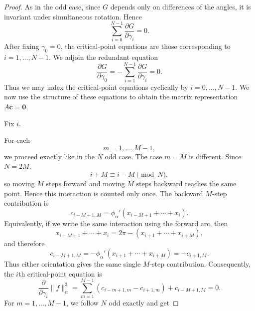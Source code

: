 \documentclass{article}
\begin{document}
\begin{proof}

As in the odd case, since $G$ depends only on differences of the angles, it is invariant under simultaneous rotation. Hence
\[
\sum_{i=0}^{N-1}\frac{\partial G}{\partial\gamma_i}=0.
\]
After fixing $\gamma_0=0$, the critical-point equations are those
corresponding to $i=1,\dots,N-1$. We adjoin the redundant equation
\[
\frac{\partial G}{\partial\gamma_0}
=
-\sum_{i=1}^{N-1}\frac{\partial G}{\partial\gamma_i}
=
0.
\]
Thus we may index the critical-point equations cyclically by
$i=0,\dots,N-1$. We now use the structure of these equations to obtain
the matrix representation $A\mathbf{c}=\mathbf{0}$. 

Fix $i$.

For each
\[
m=1,\dots,M-1,
\]
we proceed exactly like in the $N$ odd case.
The case $m=M$ is different. Since $N=2M$,
\[
i+M\equiv i-M\pmod N,
\]
so moving $M$ steps forward and moving $M$ steps backward reaches the
same point. Hence this interaction is counted only once.
The backward $M$-step contribution is
\[
c_{i-M+1,M}
=
\phi_\alpha'
\left(
x_{i-M+1}+\cdots+x_i
\right).
\]
Equivalently, if we write the same interaction using the forward arc,
then
\[
x_{i-M+1}+\cdots+x_i
=
2\pi-
\left(
x_{i+1}+\cdots+x_{i+M}
\right),
\]
and therefore
\[
c_{i-M+1,M}
=
-\phi_\alpha'
\left(
x_{i+1}+\cdots+x_{i+M}
\right)
=
-c_{i+1,M}.
\]
Thus either orientation gives the same single $M$-step contribution.
Consequently, the $i$th critical-point equation is
\[
\frac{\partial}{\partial\gamma_i}\|f\|_\alpha^2
=
\sum_{m=1}^{M-1}
\left(
c_{i-m+1,m}-c_{i+1,m}
\right)
+
c_{i-M+1,M}
=
0.
\]
For $m=1,\dots,M-1$, we follow $N$ odd exactly and get

\end{proof}
\end{document}
